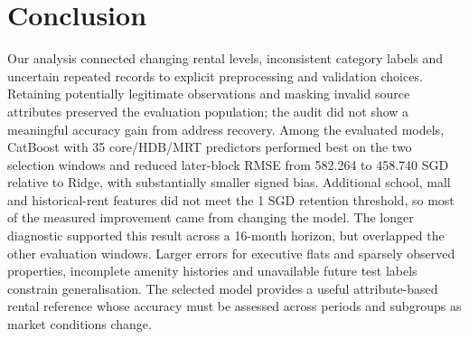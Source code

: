 \documentclass[conference]{IEEEtran}
\begin{document}
\section{Conclusion}
\label{sec:conclusion}
Our analysis connected changing rental levels, inconsistent category labels
and uncertain repeated records to explicit preprocessing and validation
choices. Retaining potentially legitimate observations and masking invalid
source attributes preserved the evaluation population; the audit did not
show a meaningful accuracy gain from address recovery. Among the evaluated
models, CatBoost with 35 core/HDB/MRT predictors performed best on the two
selection windows and reduced later-block RMSE from 582.264 to 458.740 SGD
relative to Ridge, with substantially smaller signed bias. Additional
school, mall and historical-rent features did not meet the 1 SGD retention
threshold, so most of the measured improvement came from changing the model.
The longer diagnostic supported this result across a 16-month horizon,
but overlapped the other evaluation windows. Larger errors for executive
flats and sparsely observed properties, incomplete amenity histories and
unavailable future test labels constrain generalisation. The selected model
provides a useful attribute-based rental reference whose accuracy must be
assessed across periods and subgroups as market conditions change.
\end{document}
